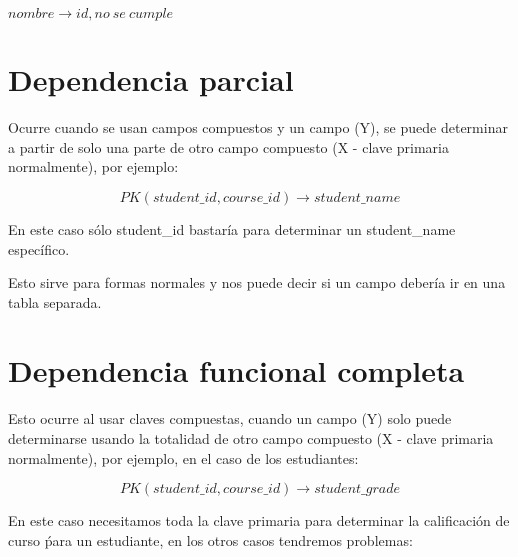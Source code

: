 \documentclass{article}
\begin{document}
\begin{multicols}{2}
\begin{center}
			
			$nombre \rightarrow id, no \ se \ cumple$
		\end{center}
		
		\section{Dependencia parcial}
		
		Ocurre cuando se usan campos compuestos y un campo (Y), se puede determinar a partir de solo una parte de otro campo compuesto (X - clave primaria normalmente), por ejemplo:
		
		\[
		PK(student\_id, course\_id) \rightarrow student\_name
		\]
		
		En este caso sólo student\_id bastaría para determinar un student\_name específico.
		
		Esto sirve para formas normales y nos puede decir si un campo debería ir en una tabla separada.
		
		\section{Dependencia funcional completa}
		
		Esto ocurre al usar claves compuestas, cuando un campo (Y) solo puede determinarse usando la totalidad de otro campo compuesto (X - clave primaria normalmente), por ejemplo, en el caso de los estudiantes:
		
		\[
		PK(student\_id, course\_id) \rightarrow student\_grade
		\]
		
		En este caso necesitamos toda la clave primaria para determinar la calificación de curso ṕara un estudiante, en los otros casos tendremos problemas:
		

\end{multicols}
\end{document}
